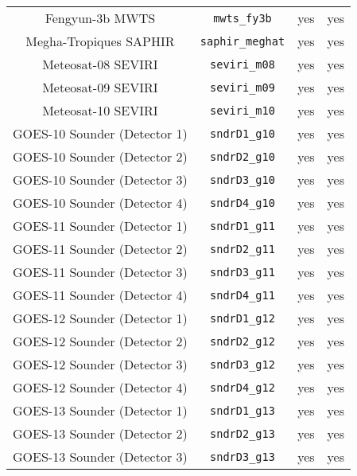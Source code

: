 \begin{center}
\begin{longtable}{c c c c}
  Fengyun-3b MWTS                    & \texttt{mwts\_fy3b}          &  yes     &  yes       \\
  Megha-Tropiques SAPHIR             & \texttt{saphir\_meghat}      &  yes     &  yes       \\
  Meteosat-08 SEVIRI                 & \texttt{seviri\_m08}         &  yes     &  yes       \\
  Meteosat-09 SEVIRI                 & \texttt{seviri\_m09}         &  yes     &  yes       \\
  Meteosat-10 SEVIRI                 & \texttt{seviri\_m10}         &  yes     &  yes       \\
  GOES-10 Sounder (Detector 1)       & \texttt{sndrD1\_g10}         &  yes     &  yes       \\
  GOES-10 Sounder (Detector 2)       & \texttt{sndrD2\_g10}         &  yes     &  yes       \\
  GOES-10 Sounder (Detector 3)       & \texttt{sndrD3\_g10}         &  yes     &  yes       \\
  GOES-10 Sounder (Detector 4)       & \texttt{sndrD4\_g10}         &  yes     &  yes       \\
  GOES-11 Sounder (Detector 1)       & \texttt{sndrD1\_g11}         &  yes     &  yes       \\
  GOES-11 Sounder (Detector 2)       & \texttt{sndrD2\_g11}         &  yes     &  yes       \\
  GOES-11 Sounder (Detector 3)       & \texttt{sndrD3\_g11}         &  yes     &  yes       \\
  GOES-11 Sounder (Detector 4)       & \texttt{sndrD4\_g11}         &  yes     &  yes       \\
  GOES-12 Sounder (Detector 1)       & \texttt{sndrD1\_g12}         &  yes     &  yes       \\
  GOES-12 Sounder (Detector 2)       & \texttt{sndrD2\_g12}         &  yes     &  yes       \\
  GOES-12 Sounder (Detector 3)       & \texttt{sndrD3\_g12}         &  yes     &  yes       \\
  GOES-12 Sounder (Detector 4)       & \texttt{sndrD4\_g12}         &  yes     &  yes       \\
  GOES-13 Sounder (Detector 1)       & \texttt{sndrD1\_g13}         &  yes     &  yes       \\
  GOES-13 Sounder (Detector 2)       & \texttt{sndrD2\_g13}         &  yes     &  yes       \\
  GOES-13 Sounder (Detector 3)       & \texttt{sndrD3\_g13}         &  yes     &  yes       \\

\end{longtable}
\end{center}
